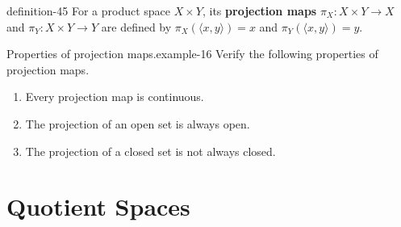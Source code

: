\documentclass[10pt,]{article}
\newcommand{\terminology}[1]{\textbf{#1}}
\newcommand{\tuple}[1]{\langle #1 \rangle}
\begin{document}
\begin{definition}{}{definition-45}%
\hypertarget{p-181}{}%
For a product space \(X\times Y\), its \terminology{projection maps} \(\pi_X:X\times Y\to X\) and \(\pi_Y:X\times Y\to Y\) are defined by \(\pi_X(\tuple{x,y})=x\) and \(\pi_Y(\tuple{x,y})=y\).%
\end{definition}
\begin{example}{Properties of projection maps.}{example-16}%
\hypertarget{p-182}{}%
Verify the following properties of projection maps.%
\leavevmode%
\begin{enumerate}
\item\hypertarget{li-113}{}Every projection map is continuous.%
\item\hypertarget{li-114}{}The projection of an open set is always open.%
\item\hypertarget{li-115}{}The projection of a closed set is not always closed.%
\end{enumerate}
\end{example}
%
%
\typeout{************************************************}
\typeout{************************************************}
%
\section[{Quotient Spaces}]{Quotient Spaces}\label{section-quotient-spaces}
%
%
\typeout{************************************************}
\typeout{************************************************}
%
%
\appendix
%
\end{document}
